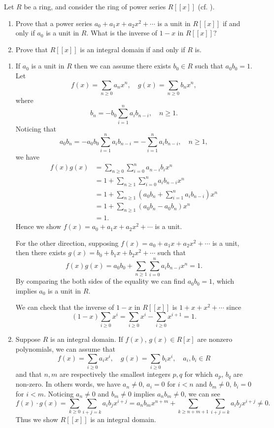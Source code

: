 \documentclass[12pt,letterpaper,boxed]{hmcpset}
\begin{document}
\begin{problem}[1.16]
	Let $R$ be a ring, and consider the ring of power series $R[[x]]$ (cf. ).
	\begin{enumerate}
		\item Prove that a power series $a_0+a_1x+a_2x^2+\cdots$ is a unit in $R[[x]]$ if and only if	$a_0$ is a unit in $R$. What is the inverse of $1-x$ in $R[[x]]$?
		\item Prove that $R[[x]]$ is an integral domain if and only if $R$ is.
	\end{enumerate}
\end{problem}
\begin{solution}
	\begin{enumerate}
		\item If $a_0$ is a unit in $R$ then we can assume there exists $b_0\in R$ such that $a_0b_0=1$. Let 
		\[
		f(x)=\sum_{n \ge 0} a_{n} x^{n},\quad g(x)=\sum_{n \ge 0} b_{n} x^{n}, 
		\]
		where
		\[
		b_n = -b_0 \sum_{i=1}^n a_i b_{n-i},\quad n\ge1.
		\]
		Noticing that 
		\[
		a_0b_n= -a_0b_0 \sum_{i=1}^n a_i b_{n-i}=- \sum_{i=1}^n a_i b_{n-i},\quad n\ge1,
		\]
		we have
		\begin{align*}
		f(x)g(x)&=\sum_{n \ge 0}\sum_{i=0}^na_{n-i}b_{i}x^n\\
		&=1+\sum_{n \ge 1}\sum_{i=0}^na_{i}b_{n-i}x^n\\
		&=1+\sum_{n \ge 1}\left(a_0b_n+\sum_{i=1}^na_{i}b_{n-i}\right)x^n\\
		&=1+\sum_{n \ge 1}\left(a_0b_n-a_0b_n\right)x^n\\
		&=1.
		\end{align*}
		Hence we show $f(x)=a_0+a_1x+a_2x^2+\cdots$ is a unit.
		
		For the other direction, supposing $f(x)=a_0+a_1x+a_2x^2+\cdots$ is a unit, then there exists $g(x)=b_0+b_1x+b_2x^2+\cdots$ such that 
		\[
		f(x)g(x)=a_0b_0+\sum_{n \ge 1}\sum_{i=0}^na_{i}b_{n-i}x^n=1.
		\]
		By comparing the both sides of the equality we can find $a_0b_0=1$, which implies $a_0$ is a unit in $R$.
		
		We can check that the inverse of $1-x$ in $R[[x]]$ is $1+x+x^2+\cdots$ since
		\[
		(1-x)\sum_{i \ge 0}x^i=\sum_{i \ge 0}x^i-\sum_{i \ge 0}x^{i+1}=1.
		\]
		\item Suppose $R$ is an integral domain. If $f(x)$, $g(x)\in R[x]$ are nonzero polynomials, we can assume that
		\[
		f(x)=\sum_{i \ge 0} a_{i} x^{i},\quad g(x)=\sum_{i \ge 0} b_{i} x^{i}, \quad a_i,b_i\in R
		\]
		and that $n,m$ are respectively the smallest integers $p,q$ for which $a_p$, $b_q$ are non-zero. In others words, we have $a_n\ne 0$, $a_i=0$ for $i<n$ and $b_m\ne 0$, $b_i=0$ for $i<m$.  Noticing $a_n\ne 0$ and $b_m\ne 0$ implies $a_nb_m\ne 0$, we can see
		\[
		f(x) \cdot g(x) =\sum_{k \geq 0} \sum_{i+j=k} a_{i} b_{j} x^{i+j}= a_{n} b_{m} x^{n+m}+\sum_{k\ge n+m+1}\sum_{i+j=k} a_{i} b_{j} x^{i+j}\ne 0.
		\]
		Thus we show $R[[x]]$ is an integral domain.
		

\end{enumerate}
\end{solution}
\end{document}
